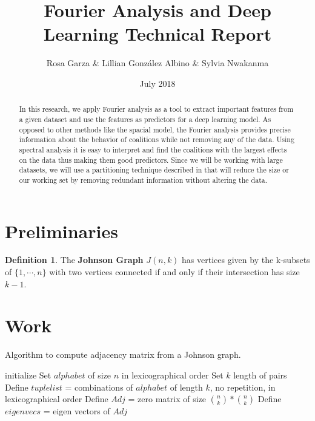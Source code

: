 \documentclass{article}
\title{Fourier Analysis and Deep Learning Technical Report}
\author{Rosa Garza & Lillian González Albino & Sylvia Nwakanma}
\date{July 2018}
\theoremstyle{remark}
\theoremstyle{definition}
\newtheorem{definition}{Definition}[section]
\begin{document}
\maketitle

\begin{abstract}
    In this research, we apply Fourier analysis as a tool to extract important features from a given dataset and use the features as predictors for a deep learning model. As opposed to other methods like the spacial model, the Fourier analysis provides precise information about the behavior of coalitions while not removing any of the data. Using spectral analysis it is easy to interpret and find the coalitions with the largest effects on the data thus making them good predictors. Since we will be working with large datasets, we will use a partitioning technique described in \cite{David} that will reduce the size or our working set by  removing redundant information without altering the data.  
\end{abstract}

\section{Preliminaries}
    \begin{definition}\cite{Jgraph} The \textbf{Johnson Graph} $J(n,k)$ has vertices given by the k-subsets of $\{1,\cdots,n\}$ with two vertices connected if and only if their intersection has size $k-1$.
    \end{definition}

\section{Work}
    Algorithm to compute adjacency matrix from a Johnson graph. \\
    \begin{algorithm}[H]
        \SetAlgoLined
        initialize\;
        Set $alphabet$ of size $n$ in lexicographical order\;
        Set $k$ length of pairs\;
        Define $tuple list$ = combinations of $alphabet$ of length $k$, no repetition, in lexicographical order\;
        Define $Adj$ = zero matrix of size $\binom{n}{k}*\binom{n}{k}$\;
        {
            {
            }
        }
        Define $eigen vecs$ = eigen vectors of $Adj$\;
    \end{algorithm}
\end{document}
